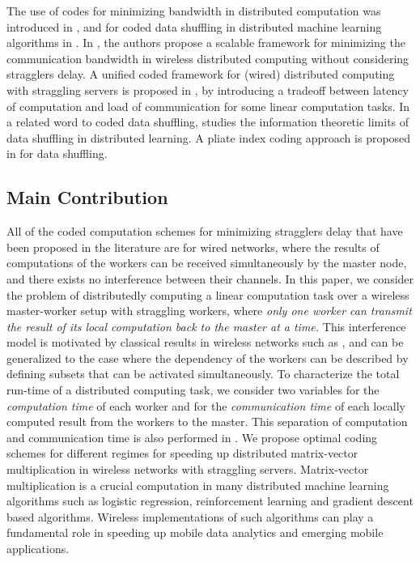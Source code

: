 \documentclass[onecolumn,journal,twoside]{IEEEtran}
\begin{document}
The use of codes for minimizing bandwidth in distributed computation was introduced in \cite{cmr,li2016fundamental}, and for coded data shuffling in distributed machine learning algorithms in \cite{lee2016speeding}. In \cite{li2017scalable}, the authors propose a scalable framework for minimizing the communication bandwidth in wireless distributed computing without considering stragglers delay. A unified coded framework for (wired) distributed computing with straggling servers is proposed in \cite{li2016unified}, by introducing a tradeoff between latency of computation and load of communication for some linear computation tasks. In a related word to coded data shuffling, \cite{attia2016information} studies the information theoretic limits of data shuffling in distributed learning. A pliate index coding approach is proposed in \cite{song2017pliable} for data shuffling.  

\subsection{Main Contribution}

All of the coded computation schemes for minimizing stragglers delay that have been proposed in the literature are for wired networks, where the results of computations of the workers can be received simultaneously by the master node, and there exists no interference between their channels. In this paper, we consider the problem of distributedly computing a linear computation task over a wireless master-worker setup with straggling workers, where \emph{only one worker can transmit the result of its local computation back to the master at a time.} This interference model is motivated by classical results in wireless networks such as \cite{tassiulas1992stability}, and can be generalized to the case where the dependency of the workers can be described by defining subsets that can be activated simultaneously. To characterize the total run-time of a distributed computing task, we consider two variables for the \emph{computation time} of each worker and for the \emph{communication time} of each locally computed result from the workers to the master. This separation of computation and communication time is also performed in \cite{multicore}. We propose optimal coding schemes for different regimes for speeding up distributed matrix-vector multiplication in wireless networks with straggling servers. Matrix-vector multiplication is a crucial computation in many distributed  machine learning algorithms such as logistic regression, reinforcement learning and gradient descent based algorithms. Wireless implementations of such algorithms can play a fundamental role in speeding up mobile data analytics and emerging mobile applications.
\end{document}
